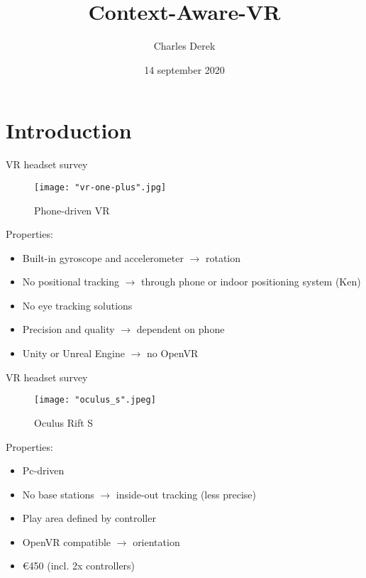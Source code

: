 \documentclass{beamer}
\title[Your Short Title]{Context-Aware-VR}
\author{Charles Derek}
\institute{University of Antwerp}
\date{14 september 2020}
\begin{document}
\begin{frame}
  \titlepage
\end{frame}


\section{Introduction}


\begin{frame}{VR headset survey}
	\begin{figure}
		\texttt{[image: "vr-one-plus".jpg]}
		\caption{Phone-driven VR}
	\end{figure}
	
	Properties:
	\begin{itemize}
		\item Built-in gyroscope and accelerometer $\rightarrow$ rotation
		\item No positional tracking $\rightarrow$ through phone or indoor positioning system (Ken)
		\item No eye tracking solutions
		\item Precision and quality $\rightarrow$ dependent on phone
		\item Unity or Unreal Engine $\rightarrow$ no OpenVR
	\end{itemize}
\end{frame}


\begin{frame}{VR headset survey}
	\begin{figure}
		\texttt{[image: "oculus\_s".jpeg]}
		\caption{Oculus Rift S}
	\end{figure}
	
	Properties:
	\begin{itemize}
		\item Pc-driven
	    \item No base stations $\rightarrow$ inside-out tracking (less precise)
	    \item Play area defined by controller
      	\item OpenVR compatible $\rightarrow$ orientation
		\item €450 (incl. 2x controllers)
	\end{itemize}
\end{frame}
\end{document}

